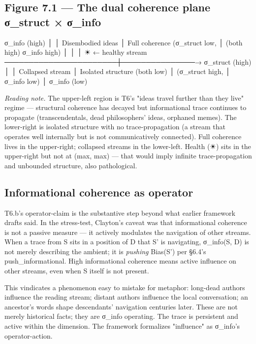 \documentclass[11pt, openany]{book}
\begin{document}
\subsection{Figure 7.1 --- The dual coherence plane σ\_\allowbreak{}struct × σ\_\allowbreak{}info}

\begin{Code}
                      σ_info (high)
                          │
                          │
   Disembodied ideas      │     Full coherence
   (σ_struct low,         │     (both high)
    σ_info high)          │
                          │
                          │   ☀ ← healthy stream
   ───────────────────────┼───────────────→ σ_struct (high)
                          │
                          │
   Collapsed stream       │     Isolated structure
   (both low)             │     (σ_struct high,
                          │      σ_info low)
                          │
                      σ_info (low)
\end{Code}

\textit{Reading note.} The upper-left region is T6's "ideas travel further than they live" regime --- structural coherence has decayed but informational trace continues to propagate (transcendentals, dead philosophers' ideas, orphaned memes). The lower-right is isolated structure with no trace-propagation (a stream that operates well internally but is not communicatively connected). Full coherence lives in the upper-right; collapsed streams in the lower-left. Health (☀) sits in the upper-right but not at (max, max) --- that would imply infinite trace-propagation and unbounded structure, also pathological.

\subsection{Informational coherence as operator}

T6.b's operator-claim is the substantive step beyond what earlier framework drafts said. In the stress-test, Clayton's caveat was that informational coherence is not a passive measure --- it actively modulates the navigation of other streams. When a trace from S sits in a position of D that S' is navigating, σ\_\allowbreak{}info(S, D) is not merely describing the ambient; it is \textit{pushing} Bias(S') per §6.4's push\_\allowbreak{}informational. High informational coherence means active influence on other streams, even when S itself is not present.

This vindicates a phenomenon easy to mistake for metaphor: long-dead authors influence the reading stream; distant authors influence the local conversation; an ancestor's words shape descendants' navigation centuries later. These are not merely historical facts; they are σ\_\allowbreak{}info operating. The trace is persistent and active within the dimension. The framework formalizes "influence" as σ\_\allowbreak{}info's operator-action.
\end{document}
